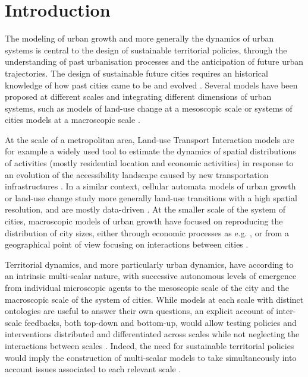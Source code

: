 \documentclass[11pt]{article}
\begin{document}


\section{Introduction}

The modeling of urban growth and more generally the dynamics of urban systems is central to the design of sustainable territorial policies, through the understanding of past urbanisation processes and the anticipation of future urban trajectories. The design of sustainable future cities requires an historical knowledge of how past cities came to be and evolved \cite{batty2018inventing}. Several models have been proposed at different scales and integrating different dimensions of urban systems, such as models of land-use change at a mesoscopic scale or systems of cities models at a macroscopic scale \cite{pumain2017urban}.

At the scale of a metropolitan area, Land-use Transport Interaction models \cite{wegener2004land} are for example a widely used tool to estimate the dynamics of spatial distributions of activities (mostly residential location and economic activities) in response to an evolution of the accessibility landscape caused by new transportation infrastructures \cite{raimbault:halshs-02265423}. In a similar context, cellular automata models of urban growth or land-use change study more generally land-use transitions with a high spatial resolution, and are mostly data-driven \cite{clarke2007decade}. At the smaller scale of the system of cities, macroscopic models of urban growth have focused on reproducing the distribution of city sizes, either through economic processes as e.g. \cite{gabaix1999zipf}, or from a geographical point of view focusing on interactions between cities \cite{favaro2011gibrat}.

Territorial dynamics, and more particularly urban dynamics, have according to \cite{pumain1997pour} an intrinsic multi-scalar nature, with successive autonomous levels of emergence from individual microscopic agents to the mesoscopic scale of the city and the macroscopic scale of the system of cities. While models at each scale with distinct ontologies are useful to answer their own questions, an explicit account of inter-scale feedbacks, both top-down and bottom-up, would allow testing policies and interventions distributed and differentiated across scales while not neglecting the interactions between scales \cite{wegener2018multi}. Indeed, the need for sustainable territorial policies would imply the construction of multi-scalar models to take simultaneously into account issues associated to each relevant scale \cite{Rozenblat2018,raimbault:halshs-02284933}.
\end{document}
